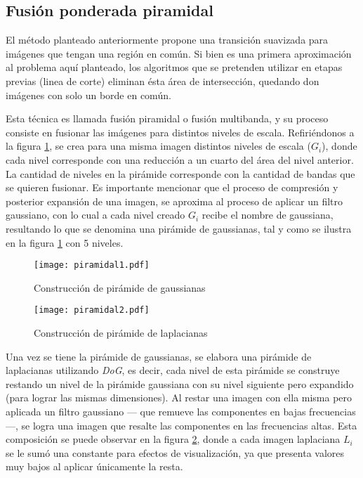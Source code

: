 \subsection{Fusión ponderada piramidal}

El método planteado anteriormente propone una transición suavizada para imágenes que tengan una región en común. Si bien es una primera aproximación al problema aquí planteado, los algoritmos que se pretenden utilizar en etapas previas (linea de corte) eliminan ésta área de intersección, quedando don imágenes con solo un borde en común. 

Esta técnica es llamada fusión piramidal o fusión multibanda, y su proceso consiste en fusionar las imágenes para distintos niveles de escala. Refiriéndonos a la figura \ref{imagen:piramidal1}, se crea para una misma imagen distintos niveles de escala ($G_i$), donde cada nivel corresponde con una reducción a un cuarto del área del nivel anterior. La cantidad de niveles en la pirámide corresponde con la cantidad de bandas que se quieren fusionar. Es importante mencionar que el proceso de compresión y posterior expansión de una imagen, se aproxima al proceso de aplicar un filtro gaussiano, con lo cual a cada nivel creado $G_i$ recibe el nombre de gaussiana, resultando lo que se denomina una pirámide de gaussianas, tal y como se ilustra en la figura \ref{imagen:piramidal1} con 5 niveles.

\begin{figure}[h]
	\centering
	\texttt{[image: piramidal1.pdf]}
	\caption[Construcción de pirámide de gaussianas]{Construcción de pirámide de gaussianas}
	\label{imagen:piramidal1}
\end{figure}



\begin{figure}[h]
	\centering
	\texttt{[image: piramidal2.pdf]}
	\caption[Construcción de pirámide de laplacianas]{Construcción de pirámide de laplacianas}
	\label{imagen:piramidal2}
\end{figure}

Una vez se tiene la pirámide de gaussianas, se elabora una pirámide de laplacianas utilizando \textit{DoG}, es decir, cada nivel de esta pirámide se construye restando un nivel de la pirámide gaussiana con su nivel siguiente pero expandido (para lograr las mismas dimensiones). Al restar una imagen con ella misma pero aplicada un filtro gaussiano --- que remueve las componentes en bajas frecuencias ---, se logra una imagen que resalte las componentes en las frecuencias altas. Esta composición se puede observar en la figura \ref{imagen:piramidal2}, donde a cada imagen laplaciana $L_i$ se le sumó una constante para efectos de visualización, ya que presenta valores muy bajos al aplicar únicamente la resta.

